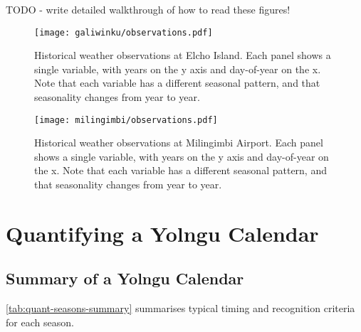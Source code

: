 TODO - write detailed walkthrough of how to read these figures!


\begin{figure}[p]
    \centering
    \texttt{[image: galiwinku/observations.pdf]}
    \caption[Historical weather observations at Elcho Island]{
        Historical weather observations at Elcho Island.
        Each panel shows a single variable, with years on the y axis and day-of-year on the x.
        Note that each variable has a different seasonal pattern,
        and that seasonality changes from year to year.}
    \label{fig:galiwinku-observations}
\end{figure}
\begin{figure}[p]
    \centering
    \texttt{[image: milingimbi/observations.pdf]}
    \caption[Historical weather observations at Milingimbi Airport]{
        Historical weather observations at Milingimbi Airport.
        Each panel shows a single variable, with years on the y axis and day-of-year on the x.
        Note that each variable has a different seasonal pattern,
        and that seasonality changes from year to year.}
    \label{fig:milingimbi-observations}
\end{figure}




\section{Quantifying a Yolngu Calendar}

\subsection{Summary of a Yolngu Calendar}
\autoref{tab:quant-seasons-summary} summarises typical timing and recognition criteria for each season.


